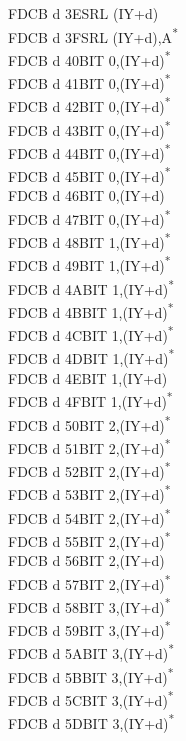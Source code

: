 \documentclass[oneside,a4paper]{book}
\begin{document}
\begin{multicols}{3}
{\begin{tabbing}
FDCB d 3E\>SRL (IY+d)\\
FDCB d 3F\>SRL (IY+d),A\textsuperscript{*}\\
FDCB d 40\>BIT 0,(IY+d)\textsuperscript{*}\\
FDCB d 41\>BIT 0,(IY+d)\textsuperscript{*}\\
FDCB d 42\>BIT 0,(IY+d)\textsuperscript{*}\\
FDCB d 43\>BIT 0,(IY+d)\textsuperscript{*}\\
FDCB d 44\>BIT 0,(IY+d)\textsuperscript{*}\\
FDCB d 45\>BIT 0,(IY+d)\textsuperscript{*}\\
FDCB d 46\>BIT 0,(IY+d)\\
FDCB d 47\>BIT 0,(IY+d)\textsuperscript{*}\\
FDCB d 48\>BIT 1,(IY+d)\textsuperscript{*}\\
FDCB d 49\>BIT 1,(IY+d)\textsuperscript{*}\\
FDCB d 4A\>BIT 1,(IY+d)\textsuperscript{*}\\
FDCB d 4B\>BIT 1,(IY+d)\textsuperscript{*}\\
FDCB d 4C\>BIT 1,(IY+d)\textsuperscript{*}\\
FDCB d 4D\>BIT 1,(IY+d)\textsuperscript{*}\\
FDCB d 4E\>BIT 1,(IY+d)\\
FDCB d 4F\>BIT 1,(IY+d)\textsuperscript{*}\\
FDCB d 50\>BIT 2,(IY+d)\textsuperscript{*}\\
FDCB d 51\>BIT 2,(IY+d)\textsuperscript{*}\\
FDCB d 52\>BIT 2,(IY+d)\textsuperscript{*}\\
FDCB d 53\>BIT 2,(IY+d)\textsuperscript{*}\\
FDCB d 54\>BIT 2,(IY+d)\textsuperscript{*}\\
FDCB d 55\>BIT 2,(IY+d)\textsuperscript{*}\\
FDCB d 56\>BIT 2,(IY+d)\\
FDCB d 57\>BIT 2,(IY+d)\textsuperscript{*}\\
FDCB d 58\>BIT 3,(IY+d)\textsuperscript{*}\\
FDCB d 59\>BIT 3,(IY+d)\textsuperscript{*}\\
FDCB d 5A\>BIT 3,(IY+d)\textsuperscript{*}\\
FDCB d 5B\>BIT 3,(IY+d)\textsuperscript{*}\\
FDCB d 5C\>BIT 3,(IY+d)\textsuperscript{*}\\
FDCB d 5D\>BIT 3,(IY+d)\textsuperscript{*}\\

\end{tabbing}}
\end{multicols}
\end{document}
